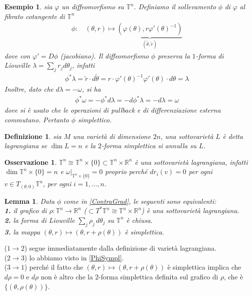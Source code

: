 \documentclass[twoside, 11pt]{amsbook}
\makeatletter
\newcommand{\0}{{(0)}}
\newcommand{\3}{{(3)}}
\theoremstyle{colonplain}
\newtheorem{lemma}[thm]{Lemma}
\theoremstyle{colondefinition}
\newtheorem{defn}[thm]{Definizione}
\newtheorem{ex}[thm]{Esempio}
\theoremstyle{colonremark}
\newtheorem{rmk}[thm]{Osservazione}
\numberwithin{equation}{chapter}
\renewcommand{\proofname}{Dimostrazione}
\renewenvironment{proof}[1][\proofname]{\par
  \pushQED{\qed}%
  \normalfont \topsep6\p@\@plus6\p@\relax
  \trivlist
  \item[\hskip\labelsep\bfseries #1:]\ignorespaces
}{%
  \popQED\endtrivlist\@endpefalse
}
\makeatother
\begin{document}
\begin{ex} sia $\varphi$ un diffeomorfismo su $\mathbb{T}^n$. Definiamo il sollevamento $\phi$ di $\varphi$ al fibrato cotangente di $\mathbb{T}^n$
\begin{align}\label{ContraGrad}
    \phi: \quad (\theta, r) \mapsto \underbrace{(\varphi(\theta), r\varphi'(\theta)^{-1})}_{(\tilde{\theta}, \tilde{r})}
\end{align}
dove con $\varphi' = D\phi$ (jacobiano). Il diffeomorfismo $\phi$ preserva la $1$-\textit{forma di Liouville} $\lambda = \sum_j r_jd\theta_j$, infatti
\begin{align}
    \phi^*\lambda = \tilde{r} \cdot d\tilde{\theta} = r \cdot \varphi'(\theta)^{-1}\varphi'(\theta) \cdot d\theta = \lambda
\end{align}
Inoltre, dato che $d\lambda = -\omega$, si ha
\begin{align}\label{PhiSympl}
    \phi^*\omega = -\phi^*d\lambda = -d\phi^*\lambda = -d\lambda = \omega
\end{align}
dove si è usato che le operazioni di pullback e di differenziazione esterna commutano. Pertanto $\phi$ simplettico.
\end{ex}
\begin{defn} sia $M$ una varietà di dimensione $2n$, una sottovarietà $L$ è detta \textit{lagrangiana} se $\dim L = n$ e la  $2$-forma simplettica si annulla su $L$.
\end{defn}
\begin{rmk} $\mathbb{T}^n \cong \mathbb{T}^n \times \{0\} \subset \mathbb{T}^n \times \mathbb{R}^n$ è una sottovarietà lagrangiana, infatti $\dim \mathbb{T}^n \times \{0\} = n$ e $\omega|_{\mathbb{T}^n \times \{0\}} = 0$ proprio perché $dr_i(v) = 0$ per ogni $v \in T_{(\theta, 0)}\mathbb{T}^n$, per ogni $i = 1, \dots, n$.
\end{rmk}
\begin{lemma}
Data $\phi$ come in \eqref{ContraGrad}, le seguenti sono equivalenti: \\
\textbf{1.} il grafico di $\rho : \mathbb{T}^n \longrightarrow \mathbb{R}^n$ ($\subset T^*\mathbb{T}^n \cong \mathbb{T}^n \times \mathbb{R}^n$) è una sottovarietà lagrangiana. \\
\textbf{2.} la forma di Liouville $\sum_j \rho_j \, d\theta_j$ su $\mathbb{T}^n$ è chiusa. \\
\textbf{3.} la mappa $(\theta, r) \mapsto (\theta, r + \rho(\theta))$ è simplettica.
\end{lemma}
\begin{proof}
($1 \rightarrow 2$) segue immediatamente dalla definizione di varietà lagrangiana. \\
($2 \rightarrow 3$) lo abbiamo visto in \eqref{PhiSympl}. \\
($3 \rightarrow 1$) perché il fatto che $(\theta, r) \mapsto (\theta, r + \rho(\theta))$ è simplettica implica che $d\rho = 0$ e $d\rho$ non è altro che la $2$-forma simplettica definita sul grafico di $\rho$, che è $\{(\theta, \rho(\theta))\}$.
\end{proof}
\end{document}
